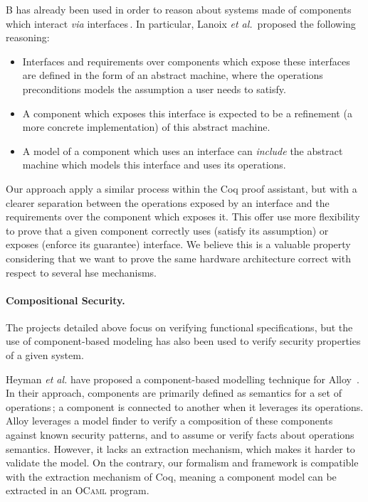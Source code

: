 B has already been used in order to reason about systems made of components
which interact \emph{via}
interfaces\,\cite{souquieres2005verifying,chouali2006proving,lanoix:hal-00105041}.
%
In particular, Lanoix \emph{et al.}\,\cite{lanoix:hal-00105041} proposed the
following reasoning:
%
\begin{itemize}
\item Interfaces and requirements over components which expose these interfaces
  are defined in the form of an abstract machine, where the operations
  preconditions models the assumption a user needs to satisfy.
\item A component which exposes this interface is expected to be a refinement (a
  more concrete implementation) of this abstract machine.
\item A model of a component which uses an interface can \emph{include} the
  abstract machine which models this interface and uses its operations. 
\end{itemize}
%
Our approach apply a similar process within the Coq proof assistant, but with a
clearer separation between the operations exposed by an interface and the
requirements over the component which exposes it.
%
This offer use more flexibility  to prove that a given component correctly uses
(satisfy its assumption) or exposes (enforce its guarantee) interface.
%
We believe this is a valuable property considering that we want to prove the
same hardware architecture correct  with respect to several \ac{hse} mechanisms.

\paragraph{Compositional Security.}

The projects detailed above focus on verifying functional specifications, but
the use of component-based modeling has also been used to verify security properties of a given
system.

Heyman \emph{et al.} have proposed a component-based modelling technique for
Alloy\,\cite{jackson2012alloy} . In their approach, components are primarily defined as
semantics for a set of operations\,\cite{heyman2012securemodel}; a component is
connected to another when it leverages its operations. 
%
Alloy leverages a model finder to verify a composition of these components
against known security patterns, and to assume or verify facts about operations
semantics.
%
However, it lacks an extraction mechanism, which makes it harder to validate the
model.
%
On the contrary, our formalism and framework is compatible with the extraction
mechanism of Coq, meaning a component model can be extracted in an {\scshape
  OCaml} program. 

